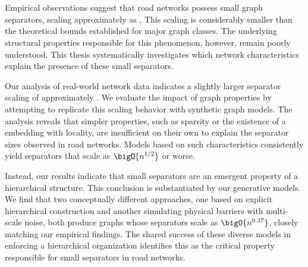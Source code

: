 \section*{\abstractname}

Empirical observations suggest that road networks possess small graph separators, scaling approximately as .
This scaling is considerably smaller than the theoretical bounds established for major graph classes.
The underlying structural properties responsible for this phenomenon, however, remain poorly understood.
This thesis systematically investigates which network characteristics explain the presence of these small separators.

Our analysis of real-world network data indicates a slightly larger separator scaling of approximately .
We evaluate the impact of graph properties by attempting to replicate this scaling behavior with synthetic graph models.
The analysis reveals that simpler properties, such as sparsity or the existence of a embedding with locality, are insufficient on their own to explain the separator sizes observed in road networks.
Models based on such characteristics consistently yield separators that scale as \(\bigO{n^{1/2}}\) or worse.

Instead, our results indicate that small separators are an emergent property of a hierarchical structure.
This conclusion is substantiated by our generative models.
We find that two conceptually different approaches, one based on explicit hierarchical construction and another simulating physical barriers with multi-scale noise, both produce graphs whose separators scale as \(\bigO{n^{0.37}}\), closely matching our empirical findings.
The shared success of these diverse models in enforcing a hierarchical organization identifies this as the critical property responsible for small separators in road networks.
